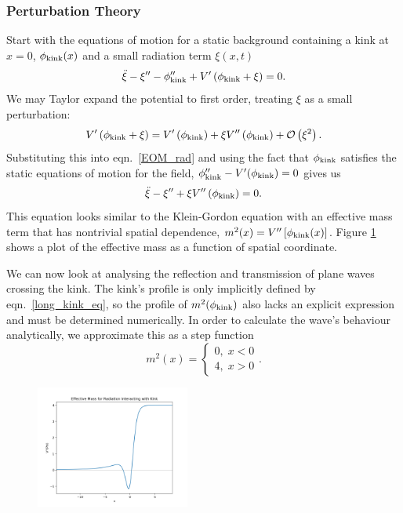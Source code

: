 \documentclass[11pt, oneside]{article}  	%
\numberwithin{equation}{section}
\begin{document}
 \subsubsection{Perturbation Theory} \label{pert_theory}
Start with the equations of motion for a static background containing a kink at $x=0$, $\phi_\textup{kink}(x)$ and a small radiation term $\xi(x,t)$
\begin{equation}\label{EOM_rad}
\ddot{\xi} - \xi'' - \phi''_\textup{kink} + V' \left( \phi_\textup{kink} + \xi \right)= 0.
\end{equation}
We may Taylor expand the potential to first order, treating $\xi$ as a small perturbation:
 \begin{equation}
 V' \left( \phi_\textup{kink} + \xi \right) = V' \left( \phi_\textup{kink} \right ) + \xi V'' \left( \phi_\textup{kink}\right) + \mathcal{O}\left(\xi^2 \right ).
 \end{equation}
 Substituting this into eqn.~\ref{EOM_rad} and using the fact that $\phi_\textup{kink}$ satisfies the static equations of motion for the field, $\phi_\textup{kink}'' - V'(\phi_\textup{kink}) = 0$ gives us
 \begin{equation}
\ddot{\xi} - \xi'' + \xi V'' \left( \phi_\textup{kink}\right)= 0.
\end{equation}
This equation looks similar to the Klein-Gordon equation with an effective mass term that has nontrivial spatial dependence, $m^2(x) = V''\left[\phi_\textup{kink}(x)\right]$. Figure \ref{mass_term} shows a plot of the effective mass as a function of spatial coordinate.\par
We can now look at analysing the reflection and transmission of plane waves crossing the kink. The kink's profile is only implicitly defined by eqn.~\ref{long_kink_eq}, so the profile of $m^2(\phi_{\textup{kink}})$ also lacks an explicit expression and must be determined numerically. In order to calculate the wave's behaviour analytically, we approximate this as a step function
\begin{equation}
m^2 (x) =\left\{\begin{matrix}
0, \; x<0\\ 
4, \; x>0
\end{matrix}\right. .
\end{equation}
\begin{figure}
\centering
 \includegraphics[width=0.45\textwidth]{mass_term.png}
  \label{mass_term}
\end{figure}
\end{document}
